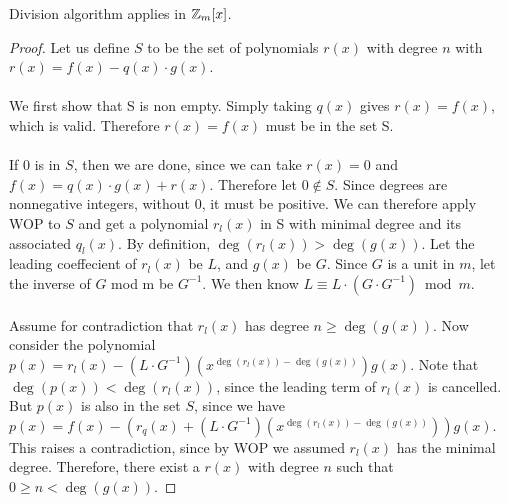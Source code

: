 \begin{theorem**}

    Division algorithm applies in $\mathbb{Z}_m[x]$.

\end{theorem**}

    \begin{proof}
    Let us define $S$ to be the set of polynomials $r(x)$ with degree $n$ with $r(x) = f(x) - q(x) \cdot g(x)$.\\\\
    We first show that S is non empty. Simply taking $q(x)$ gives $r(x) = f(x)$, which is valid. Therefore $r(x)=f(x)$ must be in the set S.\\\\
    If $0$ is in $S$, then we are done, since we can take $r(x)=0$ and $f(x) = q(x) \cdot g(x)+r(x)$. Therefore let $0 \not \in S$. Since degrees are nonnegative integers, without 0, it must be positive. We can therefore apply WOP to $S$ and get a polynomial $r_l(x)$ in S with minimal degree and its associated $q_l(x)$. By definition, $\deg(r_l(x)) >  \deg(g(x))$. Let the leading coeffecient of $r_l(x)$ be $L$, and $g(x)$ be $G$. Since $G$ is a unit in $m$, let the inverse of $G$ mod m be $G^{-1}$. We then know $L \equiv L \cdot (G \cdot G^{-1}) \bmod m$. \\\\
    Assume for contradiction that $r_l(x)$ has degree $n \geq \deg(g(x))$. Now consider the polynomial $p(x) = r_l(x)-(L \cdot G^{-1})(x^{\deg(r_l(x))-\deg(g(x))})g(x)$. Note that $\deg(p(x)) < \deg(r_l(x))$, since the leading term of $r_l(x)$ is cancelled. But $p(x)$ is also in the set $S$, since we have $p(x) = f(x) - (r_q(x) +(L \cdot G^{-1})(x^{\deg(r_l(x))-\deg(g(x))}) )g(x)$. This raises a contradiction, since by WOP we assumed $r_l(x)$ has the minimal degree. Therefore, there exist a $r(x)$ with degree $n$ such that $0 \geq n < \deg(g(x))$.
\end{proof}